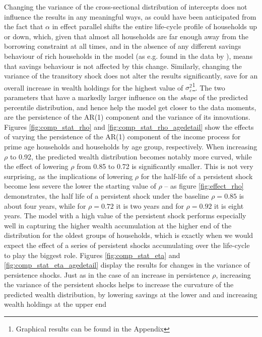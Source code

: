 Changing the variance of the cross-sectional distribution of intercepts does not
influence the results in any meaningful ways, as could have been anticipated 
from the fact that $\alpha$ in effect parallel shifts the entire life-cycle
profile of households up or down, which, given that almost all households are 
far enough away from the borrowing constraint at all times, and in the absence
of any different savings behaviour of rich households in the model (as e.g. found
in the data by \citealt{DSK2004}), means that savings behaviour is not affected
by this change. Similarly, changing the variance of the transitory shock does 
not alter the results significantly, save for an overall increase in wealth holdings
for the highest value of $\sigma^2_{\varepsilon}$\footnote{Graphical results can be found
in the Appendix}.
The two parameters that have a markedly larger influence on the \textit{shape}
of the predicted percentile distribution, and hence help the model get closer
to the data moments, are the persistence of the AR(1) component and the variance
of its innovations. Figures \ref{fig:comp_stat_rho} and \ref{fig:comp_stat_rho_agedetail} 
show the effects of varying the persistence of the AR(1) component of the income 
process for prime age households and households by age group, respectively. When
increasing $\rho$ to 0.92, the predicted wealth distribution becomes notably more
curved, while the effect of lowering $\rho$ from 0.85 to 0.72 is significantly 
smaller. This is not very surprising, as the implications of lowering $\rho$
for the half-life of a persistent shock become less severe the lower the starting
value of $\rho$ -- as figure \ref{fig:effect_rho} demonstrates, the half life
of a persistent shock under the baseline $\rho=0.85$ is about four years, while 
for $\rho=0.72$ it is two years and for $\rho=0.92$ it is eight years. The model
with a high value of the persistent shock performs especially well in capturing
the higher wealth accumulation at the higher end of the distribution for the oldest
groups of households, which is exactly when we would expect the effect of a 
series of persistent shocks accumulating over the life-cycle to play the biggest
role. 
Figures \ref{fig:comp_stat_eta} and \ref{fig:comp_stat_eta_agedetail} display
the results for changes in the variance of persistence shocks. Just as in the 
case of an increase in persistence $\rho$, increasing the variance of the persistent
shocks helps to increase the curvature of the predicted wealth distribution, by
lowering savings at the lower and and increasing wealth holdings at the upper end
